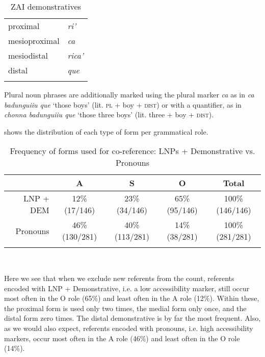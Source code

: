 \begin{table}  

\caption{{ZAI demonstratives}}
\begin{tabular}{ l  l }
\lsptoprule
 {proximal} & \textit{ri'} \\

 
 {mesioproximal} & \textit{ca} \\

 
 {mesiodistal} & \textit{rica'} \\

 
 {distal} & \textit{que} \\

\lspbottomrule
\end{tabular}
\label{zdmn}

\end{table}
Plural noun phrases are additionally marked using the plural marker \textit{ca} as in \textit{ca badunguiiu que} `those boys' (lit. \textsc{pl} + boy + \textsc{dist}) or with a quantifier, as in \textit{chonna badunguiiu que} `those three boys' (lit. three + boy + \textsc{dist}).

 shows the distribution of each type of form per grammatical role.

\begin{table}

\caption{{Frequency of forms used for co-reference: LNPs + Demonstrative vs. Pronouns}}
\begin{tabular}{ r  c  c  c  c }
\lsptoprule
 & \textsc{A} & \textsc{S} & \textsc{O} & Total\\

\midrule
LNP + DEM & 12{\%} (17/146) & 23{\%} (34/146) & 65{\%} (95/146) & 100{\%} (146/146)  \\

 
Pronouns & 46{\%} (130/281) & 40{\%} (113/281) & 14{\%} (38/281) & 100{\%} (281/281)  \\

\lspbottomrule
\end{tabular}\\
\label{coreferenceforms}

\end{table}
Here we see that when we exclude new referents from the count, referents encoded with LNP + Demonstrative, i.e. a low accessibility marker, still occur most often in the O role (65{\%}) and least often in the A role (12{\%}). Within these, the proximal form is used only two times, the medial form only once, and the distal form zero times. The distal demonstrative is by far the most frequent. Also, as we would also expect, referents encoded with pronouns, i.e. high accessibility markers, occur most often in the A role (46{\%}) and least often in the O role (14{\%}). 


